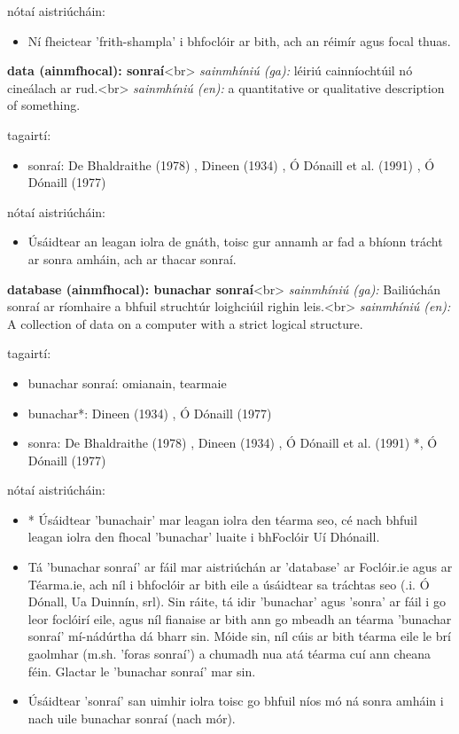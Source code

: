 \documentclass{article}
\begin{document}
nótaí aistriúcháin:
\begin{itemize}
	\item Ní fheictear 'frith-shampla' i bhfoclóir ar bith, ach an réimír agus focal thuas.
\end{itemize}


\textbf{data (ainmfhocal): sonraí}<br>
\textit{sainmhíniú (ga):} léiriú cainníochtúil nó cineálach ar rud.<br>
\textit{sainmhíniú (en):} a quantitative or qualitative description of something.

tagairtí:
\begin{itemize}
	\item sonraí: De Bhaldraithe (1978) \cite{de-bhaldraithe}, Dineen (1934) \cite{dineen}, Ó Dónaill et al. (1991) \cite{focloir-beag}, Ó Dónaill (1977) \cite{odonaill}
\end{itemize}

nótaí aistriúcháin:
\begin{itemize}
	\item Úsáidtear an leagan iolra de gnáth, toisc gur annamh ar fad a bhíonn trácht ar sonra amháin, ach ar thacar sonraí.
\end{itemize}


\textbf{database (ainmfhocal): bunachar sonraí}<br>
\textit{sainmhíniú (ga):} Bailiúchán sonraí ar ríomhaire a bhfuil struchtúr loighciúil righin leis.<br>
\textit{sainmhíniú (en):} A collection of data on a computer with a strict logical structure.

tagairtí:
\begin{itemize}
	\item bunachar sonraí: omianain, tearmaie
	\item bunachar*: Dineen (1934) \cite{dineen}, Ó Dónaill (1977) \cite{odonaill}
	\item sonra: De Bhaldraithe (1978) \cite{de-bhaldraithe}, Dineen (1934) \cite{dineen}, Ó Dónaill et al. (1991) \cite{focloir-beag}*, Ó Dónaill (1977) \cite{odonaill}
\end{itemize}

nótaí aistriúcháin:
\begin{itemize}
	\item * Úsáidtear 'bunachair' mar leagan iolra den téarma seo, cé nach bhfuil leagan iolra den fhocal 'bunachar' luaite i bhFoclóir Uí Dhónaill.
	\item Tá 'bunachar sonraí' ar fáil mar aistriúchán ar 'database' ar Foclóir.ie agus ar Téarma.ie, ach níl i bhfoclóir ar bith eile a úsáidtear sa tráchtas seo (.i. Ó Dónall, Ua Duinnín, srl). Sin ráite, tá idir 'bunachar' agus 'sonra' ar fáil i go leor foclóirí eile, agus níl fianaise ar bith ann go mbeadh an téarma 'bunachar sonraí' mí-nádúrtha dá bharr sin. Móide sin, níl cúis ar bith téarma eile le brí gaolmhar (m.sh. 'foras sonraí') a chumadh nua atá téarma cuí ann cheana féin. Glactar le 'bunachar sonraí' mar sin.
	\item Úsáidtear 'sonraí' san uimhir iolra toisc go bhfuil níos mó ná sonra amháin i nach uile bunachar sonraí (nach mór).
\end{itemize}
\end{document}
